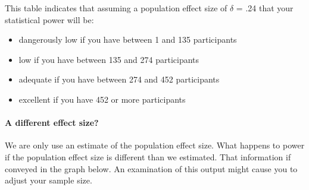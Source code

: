\documentclass[
]{krantz}
\begin{document}
This table indicates that assuming a population effect size of \(\delta\) = .24 that your statistical power will be:

\begin{itemize}
\item
  dangerously low if you have between 1 and 135 participants
\item
  low if you have between 135 and 274 participants
\item
  adequate if you have between 274 and 452 participants
\item
  excellent if you have 452 or more participants
\end{itemize}

\hypertarget{a-different-effect-size-1}{%
\paragraph{A different effect size?}\label{a-different-effect-size-1}}

We are only use an estimate of the population effect size. What happens to power if the population effect size is different than we estimated. That information if conveyed in the graph below. An examination of this output might cause you to adjust your sample size.
\end{document}
